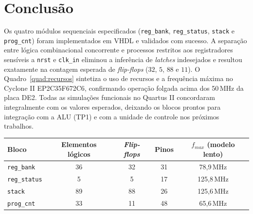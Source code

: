 \documentclass[
	12pt,				%
	oneside,			%
	a4paper,			%
	sumario = tradicional,
	english,			%
	brazilian			%
	]{abntex2}
\begin{document}
{\SingleSpacing\FloatBarrier}

\chapter{Conclusão}
\label{cap:conclusao}

Os quatro módulos sequenciais especificados (\texttt{reg\_bank}, \texttt{reg\_status}, \texttt{stack} e \texttt{prog\_cnt}) foram implementados em VHDL e validados com sucesso. A separação entre lógica combinacional concorrente e processos restritos aos registradores sensíveis a \texttt{nrst} e \texttt{clk\_in} eliminou a inferência de \textit{latches} indesejados e resultou exatamente na contagem esperada de \textit{flip-flops} ($32$, $5$, $88$ e $11$). O Quadro~\ref{quad:recursos} sintetiza o uso de recursos e a frequência máxima no Cyclone II EP2C35F672C6, confirmando operação folgada acima dos 50\,MHz da placa DE2. Todas as simulações funcionais no Quartus II concordaram integralmente com os valores esperados, deixando os blocos prontos para integração com a ALU (TP1) e com a unidade de controle nos próximos trabalhos.

\begin{quadro}[!htb]
  \SingleSpacing
  \caption{Recursos e \textit{timing} de cada bloco no Cyclone II EP2C35F672C6, com clock de 50\,MHz.}
  \label{quad:recursos}
  \centering
  \begin{tabular}{lcccc}
    \hline
    Bloco & Elementos lógicos & \textit{Flip-flops} & Pinos & $f_{max}$ (modelo lento) \\ \hline
    \texttt{reg\_bank}   & 36 & 32 & 31 & 78,9\,MHz \\
    \texttt{reg\_status} & 5  & 5  & 17 & 125,8\,MHz \\
    \texttt{stack}       & 89 & 88 & 26 & 125,6\,MHz \\
    \texttt{prog\_cnt}   & 33 & 11 & 48 & 65,6\,MHz \\ \hline
  \end{tabular}
\end{quadro}

\postextual
\pagestyle{plain}

{\SingleSpacing
\printbibliography[heading=bibintoc,title={Referências}]
}
\end{document}
